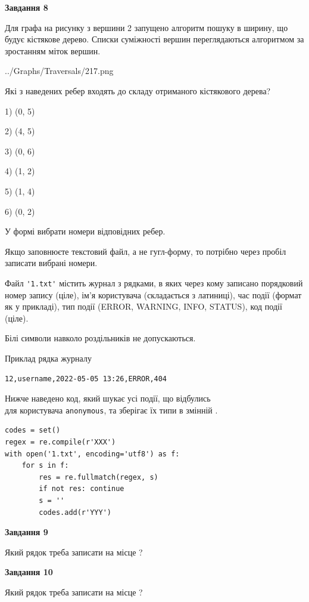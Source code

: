 \documentclass[12pt, ukrainian]{article}
\def\code#1{\Verb!#1!}
\begin{document}
{\begin {large}
{\begin {center}\textbf{Завдання 8}\end {center}}\par
Для графа на рисунку з вершини 2 запущено алгоритм пошуку в ширину, що будує кістякове дерево. Списки суміжності вершин переглядаються алгоритмом за зростанням міток вершин.\par
\begin{center}
	{../Graphs/Traversals/217.png}
\end{center}
\par Які з наведених ребер входять до складу отриманого кістякового дерева?\par
1) (0, 5)\par
2) (4, 5)\par
3) (0, 6)\par
4) (1, 2)\par
5) (1, 4)\par
6) (0, 2)\par
{\vskip 15pt} У формі вибрати номери відповідних ребер.


Якщо заповнюєте текстовий файл, а не гугл-форму, то потрібно через пробіл записа\-ти вибрані номери.\par
\newpage


Файл \code{'1.txt'} містить журнал з рядками, в яких через кому записано поряд\-ко\-вий номер запису (ціле), ім'я користувача (складається з латиниці), час події (фор\-мат як у прикладі), тип події (ERROR, WARNING, INFO, STATUS), код події (ціле).

Білі символи навколо роздільників не допускаються.

Приклад рядка журналу



\begin{verbatim}
12,username,2022-05-05 13:26,ERROR,404
\end{verbatim}


Нижче наведено код, який шукає усі події, що відбулись\\ для користувача \code{anonymous}, та зберігає їх типи в змінній .



\begin{verbatim}
codes = set()
regex = re.compile(r'XXX')
with open('1.txt', encoding='utf8') as f:
    for s in f:
        res = re.fullmatch(regex, s)
        if not res: continue
        s = ''
        codes.add(r'YYY')
\end{verbatim}


{\begin {center}\textbf{Завдання 9}\end {center}}\par
Який рядок треба записати на місце  ?\par
\vspace{5mm}


{\begin {center}\textbf{Завдання 10}\end {center}}\par
Який рядок треба записати на місце  ?\par


\newpage


\end {large}}
\end{document}
